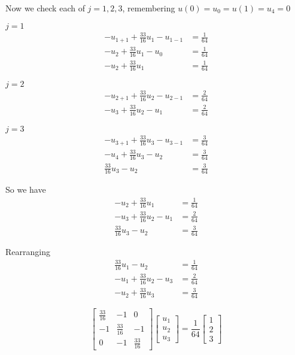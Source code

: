 \documentclass[12pt,letterpaper]{article}
\begin{document}
      Now we check each of $j = 1,2,3$, remembering $u(0) = u_0 = u(1) = u_4 = 0$

      $j = 1$
      \begin{align*}
        -u_{1+1} + \tfrac{33}{16}u_1 - u_{1-1} &= \tfrac{1}{64} \\
        -u_2 + \tfrac{33}{16}u_1 - u_0 &= \tfrac{1}{64} \\
        -u_2 + \tfrac{33}{16}u_1 &= \tfrac{1}{64}
      \end{align*}

      $j = 2$
      \begin{align*}
        -u_{2+1} + \tfrac{33}{16}u_2 - u_{2-1} &= \tfrac{2}{64} \\
        -u_{3} + \tfrac{33}{16}u_2 - u_{1} &= \tfrac{2}{64}
      \end{align*}

      $j = 3$
      \begin{align*}
        -u_{3+1} + \tfrac{33}{16}u_3 - u_{3-1} &= \tfrac{3}{64} \\
        -u_{4} + \tfrac{33}{16}u_3 - u_{2} &= \tfrac{3}{64} \\
        \tfrac{33}{16}u_3 - u_{2} &= \tfrac{3}{64}
      \end{align*}

      So we have
      \begin{align*}
        -u_2 + \tfrac{33}{16}u_1 &= \tfrac{1}{64} \\
        -u_{3} + \tfrac{33}{16}u_2 - u_{1} &= \tfrac{2}{64} \\
        \tfrac{33}{16}u_3 - u_{2} &= \tfrac{3}{64}
      \end{align*}

      Rearranging
      \begin{align*}
        \tfrac{33}{16}u_1 - u_2 &= \tfrac{1}{64} \\
        -u_{1} + \tfrac{33}{16}u_2 - u_{3}&= \tfrac{2}{64} \\
        -u_{2} + \tfrac{33}{16}u_3 &= \tfrac{3}{64}
      \end{align*}

      \[
        \left[
        \begin{array}{ccc}
        \tfrac{33}{16} & -1             & 0              \\
        -1             & \tfrac{33}{16} & -1             \\
        0              & -1             & \tfrac{33}{16}
        \end{array}
        \right]
        \left[
        \begin{array}{c}
        u_1 \\
        u_2 \\
        u_3
        \end{array}
        \right]
        =
        \frac{1}{64}
        \left[
        \begin{array}{c}
        1 \\
        2 \\
        3
        \end{array}
        \right]
      \]
\end{document}
